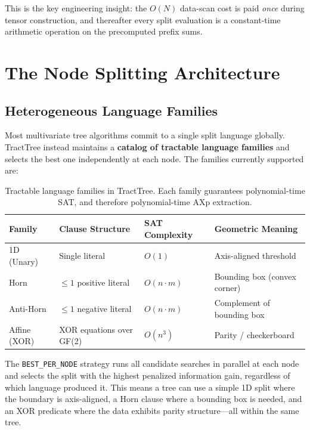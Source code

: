 \documentclass[11pt,a4paper]{article}
\begin{document}
This is the key engineering insight: the $O(N)$ data-scan cost is paid \emph{once} during tensor construction, and thereafter every split evaluation is a constant-time arithmetic operation on the precomputed prefix sums.


\section{The Node Splitting Architecture}
\label{sec:architecture}

\subsection{Heterogeneous Language Families}

Most multivariate tree algorithms commit to a single split language globally. TractTree instead maintains a \textbf{catalog of tractable language families} and selects the best one independently at each node. The families currently supported are:

\begin{table}[H]
\centering
\caption{Tractable language families in TractTree. Each family guarantees polynomial-time SAT, and therefore polynomial-time AXp extraction.}
\label{tab:languages}
\begin{tabular}{@{}llll@{}}
\toprule
\textbf{Family} & \textbf{Clause Structure} & \textbf{SAT Complexity} & \textbf{Geometric Meaning} \\
\midrule
1D (Unary) & Single literal & $O(1)$ & Axis-aligned threshold \\
Horn & $\leq 1$ positive literal & $O(n \cdot m)$ & Bounding box (convex corner) \\
Anti-Horn & $\leq 1$ negative literal & $O(n \cdot m)$ & Complement of bounding box \\
Affine (XOR) & XOR equations over GF(2) & $O(n^3)$ & Parity / checkerboard \\
\bottomrule
\end{tabular}
\end{table}

The \texttt{BEST\_PER\_NODE} strategy runs all candidate searches in parallel at each node and selects the split with the highest penalized information gain, regardless of which language produced it. This means a tree can use a simple 1D split where the boundary is axis-aligned, a Horn clause where a bounding box is needed, and an XOR predicate where the data exhibits parity structure---all within the same tree.
\end{document}

